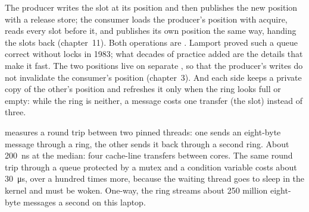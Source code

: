 The producer writes the slot at its position and then publishes the new position with a release store; the consumer loads
the producer's position with acquire, reads every slot before it, and publishes its own position the same way, handing the
slots back (chapter~11). Both operations are . Lamport proved such a queue correct without locks in 1983; what
decades of practice added are the details that make it fast. The two positions live on separate , so that the
producer's writes do not invalidate the consumer's position (chapter~3). And each side keeps a private copy of the other's
position and refreshes it only when the ring looks full or empty: while the ring is neither, a message costs one  transfer (the slot) instead of three.

\begin{omfigure}

\label{fig:ll:queues-ring-buffers-and-shared-memory:ring}
\end{omfigure}

 measures a round trip between two pinned threads: one sends an
eight-byte message through a ring, the other sends it back through a second ring. About \qty{200}{\nano\second} at the
median: four cache-line transfers between cores. The same round trip through a queue protected by a mutex and a condition
variable costs about \qty{30}{\micro\second}, over a hundred times more, because the waiting thread goes to sleep in the
kernel and must be woken. One-way, the ring streams about 250 million eight-byte messages a second on this laptop.

